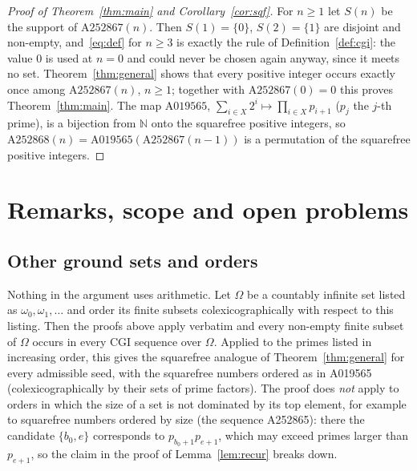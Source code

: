 \documentclass[11pt]{amsart}
\theoremstyle{definition}
\theoremstyle{remark}
\newcommand{\N}{\mathbb{N}}
\begin{document}
\begin{proof}[Proof of Theorem~\ref{thm:main} and Corollary~\ref{cor:sqf}]
For $n\ge1$ let $S(n)$ be the support of $\mathrm{A252867}(n)$. Then $S(1)=\{0\}$,
$S(2)=\{1\}$ are disjoint and non-empty, and~\eqref{eq:def} for $n\ge3$ is exactly the rule of
Definition~\ref{def:cgi}: the value $0$ is used at $n=0$ and could never be chosen again anyway,
since it meets no set. Theorem~\ref{thm:general} shows that every positive integer occurs exactly
once among $\mathrm{A252867}(n)$, $n\ge1$; together with $\mathrm{A252867}(0)=0$ this proves
Theorem~\ref{thm:main}. The map $\mathrm{A019565}$, $\sum_{i\in X}2^i\mapsto\prod_{i\in X}p_{i+1}$
($p_j$ the $j$-th prime), is a bijection from $\N$ onto the squarefree positive integers, so
$\mathrm{A252868}(n)=\mathrm{A019565}(\mathrm{A252867}(n-1))$ is a permutation of the squarefree
positive integers.
\end{proof}

\section{Remarks, scope and open problems}\label{sec:remarks}

\subsection{Other ground sets and orders}
Nothing in the argument uses arithmetic. Let $\Omega$ be a countably infinite set listed as
$\omega_0,\omega_1,\dots$ and order its finite subsets colexicographically with respect to this
listing. Then the proofs above apply verbatim and every non-empty finite subset of $\Omega$
occurs in every CGI sequence over $\Omega$. Applied to the primes listed in increasing order,
this gives the squarefree analogue of Theorem~\ref{thm:general} for every admissible seed, with
the squarefree numbers ordered as in A019565 (colexicographically by their sets of prime
factors). The proof does \emph{not} apply to orders in which the size of a set is not dominated
by its top element, for example to squarefree numbers ordered by size (the sequence A252865):
there the candidate $\{b_0,e\}$ corresponds to $p_{b_0+1}p_{e+1}$, which may exceed primes
larger than $p_{e+1}$, so the claim in the proof of Lemma~\ref{lem:recur} breaks down.
\end{document}
